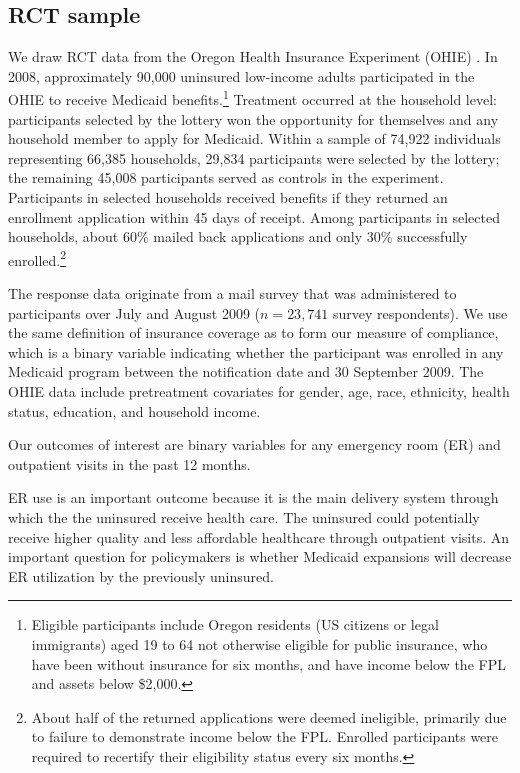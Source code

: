\documentclass[hidelinks,12pt]{article}
\begin{document}
{\subsection{RCT sample} 

We draw RCT data from the Oregon Health Insurance Experiment (OHIE) \citep{finkelstein2012,baicker2013,baicker2014,Taubman}. In 2008, approximately 90,000 uninsured low-income adults participated in the OHIE to receive Medicaid benefits.\footnote{Eligible participants include Oregon residents (US citizens or legal immigrants) aged 19 to 64 not otherwise eligible for public insurance, who have been without insurance for six months, and have income below the FPL and assets below \$2,000.} Treatment occurred at the household level: participants selected by the lottery won the opportunity for themselves and any household member to apply for Medicaid. Within a sample of 74,922 individuals representing 66,385 households, 29,834 participants were selected by the lottery; the remaining 45,008 participants served as controls in the experiment. Participants in selected households received benefits if they returned an enrollment application within 45 days of receipt. Among participants in selected households, about 60\% mailed back applications and only 30\% successfully enrolled.\footnote{{\color{red}About half of the returned applications were deemed ineligible, primarily due to failure to demonstrate income below the FPL. Enrolled participants were required to recertify their eligibility status every six months.}}

The response data originate from a mail survey that was administered to participants over July and August 2009 ($n = 23,741$ survey respondents). We use the same definition of insurance coverage as \citet{finkelstein2012} to form our measure of compliance, which is a binary variable indicating whether the participant was enrolled in any Medicaid program between the notification date and 30 September 2009. The OHIE data include pretreatment covariates for gender, age, race, ethnicity, health status, education, and household income.  

Our outcomes of interest are binary variables for any emergency room (ER) and outpatient visits in the past 12 months. {\color{red}ER use is an important outcome because it is the main delivery system through which the the uninsured receive health care. The uninsured could potentially receive higher quality and less affordable healthcare through outpatient visits. An important question for policymakers is whether Medicaid expansions will decrease ER utilization by the previously uninsured.   	

}}
\end{document}
